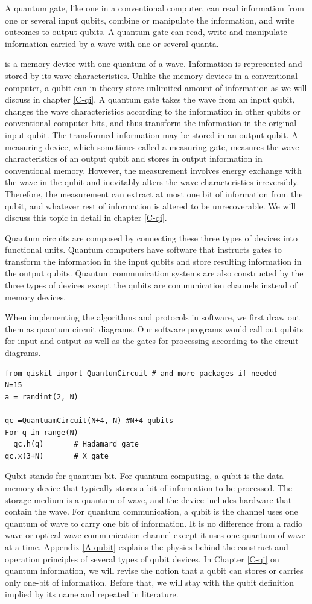\documentclass[Letter,11pt]{book}
\begin{document}
A quantum gate, like one in a conventional computer, can read information from one or several input qubits, combine or manipulate the information, and write outcomes to output qubits. A quantum gate can read, write and manipulate information carried by a wave with one or several quanta. 

is a memory device with one quantum of a wave. Information is represented and stored by its wave characteristics. Unlike the memory devices in a conventional computer, a qubit can in theory store unlimited amount of information as we will discuss in chapter \ref{C-qi}. A quantum gate takes the wave from an input qubit, changes the wave characteristics according to the information in other qubits or conventional computer bits, and thus transform the information in the original input qubit. The transformed information may be stored in an output qubit. A measuring device, which sometimes called a measuring gate, measures the wave characteristics of an output qubit and stores in output information in conventional memory. However, the measurement involves energy exchange with the wave in the qubit and inevitably alters the wave characteristics irreversibly. Therefore, the measurement can extract at most one bit of information from the qubit, and whatever rest of information is altered to be unrecoverable. We will discuss this topic in detail in chapter \ref{C-qi}.

Quantum circuits are composed by connecting these three types of devices into functional units. Quantum computers have software that instructs gates to transform the information in the input qubits and store resulting information in the output qubits. Quantum communication systems are also constructed by the three types of devices except the qubits are communication channels instead of memory devices.

When implementing the algorithms and protocols in software, we first draw out them as quantum circuit diagrams. Our software programs would call out qubits for input and output as well as the gates for processing according to the circuit diagrams.
\begin{verbatim}
from qiskit import QuantumCircuit # and more packages if needed
N=15
a = randint(2, N) 

qc =QuantuamCircuit(N+4, N)	#N+4 qubits
For q in range(N)
  qc.h(q)		# Hadamard gate
qc.x(3+N)		# X gate
\end{verbatim}
Qubit stands for quantum bit. For quantum computing, a qubit is the data memory device that typically stores a bit of information to be processed. The storage medium is a quantum of wave, and the device includes hardware that contain the wave. For quantum communication, a qubit is the channel uses one quantum of wave to carry one bit of information. It is no difference from a radio wave or optical wave communication channel except it uses one quantum of wave at a time. Appendix \ref{A-qubit} explains the physics behind the construct and operation principles of several types of qubit devices. In Chapter \ref{C-qi} on quantum information, we will revise the notion that a qubit can stores or carries only one-bit of information. Before that, we will stay with the qubit definition implied by its name and repeated in literature.
\end{document}
